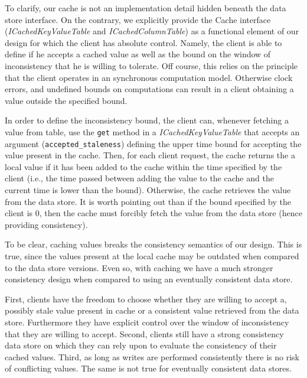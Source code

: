 To clarify, our cache is not an implementation detail hidden beneath the data store interface. 
On the contrary, we explicitly provide the Cache interface (\emph{ICachedKeyValueTable} and \emph{ICachedColumnTable}) as a functional element of our design for which the client has absolute control. 
Namely, the client is able to define if he accepts a cached value as well as the bound on the  window of inconsistency that he is willing to tolerate. 
Off course, this relies on the principle that the client operates in an synchronous computation model. 
Otherwise clock errors, and undefined bounds on computations can result in a client obtaining a value outside the specified bound. 

In order to define the inconsistency bound, the client can, whenever fetching a value from table, use the \texttt{get} method in a \emph{ICachedKeyValueTable} that accepts an argument (\texttt{accepted\_staleness}) defining the upper time bound for accepting the value present in the cache. 
Then, for each client request, the cache returns the a local value if it has been added to the cache within the time specified by the client (i.e., the time passed between adding the value to the cache and the current time is lower than the bound). 
Otherwise, the cache retrieves the  value from the data store. 
It is worth pointing out than if the bound specified by the client is 0, then the cache must forcibly fetch the value from the data store (hence providing consistency). 

To be clear, caching values breaks the consistency semantics of our design. 
This is true, since the values present at the local cache may be outdated when compared to the data store versions. 
Even so, with caching we have a much stronger consistency design when compared to using an eventually consistent data store. 

First, clients have the freedom to choose whether they are willing to accept a, possibly stale value present in cache or a consistent value retrieved from the data store. 
Furthermore they have explicit control over the window of inconsistency that they are willing to accept. 
Second, clients still have a strong consistency data store on which they can rely upon to evaluate the consistency of their cached values. 
Third, as long as writes are performed consistently there is no risk of conflicting values. 
The same is not true for eventually consistent data stores. 


